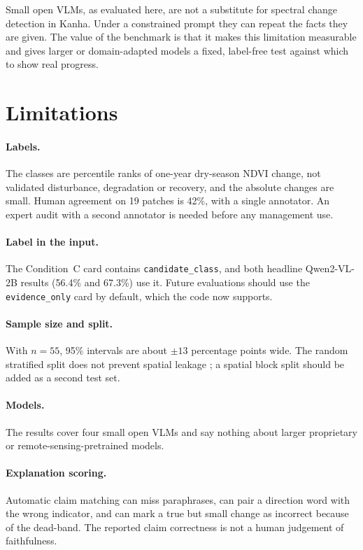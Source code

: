 \documentclass[11pt]{article}
\begin{document}
Small open VLMs, as evaluated here, are not a substitute for spectral
change detection in Kanha. Under a constrained prompt they can repeat
the facts they are given. The value of the benchmark is that it makes
this limitation measurable and gives larger or domain-adapted models a
fixed, label-free test against which to show real progress.


\section*{Limitations}

\paragraph{Labels.} The classes are percentile ranks of one-year
dry-season NDVI change, not validated disturbance, degradation or
recovery, and the absolute changes are small. Human agreement on 19
patches is 42\%, with a single annotator. An expert audit with a second
annotator is needed before any management use.

\paragraph{Label in the input.} The Condition~C card contains
\texttt{candidate\_class}, and both headline Qwen2-VL-2B results (56.4\%
and 67.3\%) use it. Future evaluations should use the
\texttt{evidence\_only} card by default, which the code now supports.


\paragraph{Sample size and split.} With $n = 55$, 95\% intervals are about
$\pm 13$ percentage points wide. The random stratified split does not
prevent spatial leakage ; a spatial block split should
be added as a second test set.

\paragraph{Models.} The results cover four small open VLMs and say nothing
about larger proprietary or remote-sensing-pretrained models.

\paragraph{Explanation scoring.} Automatic claim matching can miss
paraphrases, can pair a direction word with the wrong indicator, and can
mark a true but small change as incorrect because of the dead-band. The
reported claim correctness is not a human judgement of faithfulness.
\end{document}
